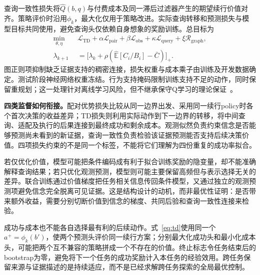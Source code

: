 \documentclass[sigconf,anonymous,review]{acmart}
\newcommand{\E}{\mathbb{E}}
\theoremstyle{zhplain}
\begin{document}
查询一致性损失将\(\hat Q(b,q)\)与付费成本及同一滞后过滤器产生的期望续行价值对齐。策略评价时沿用\(\phi_k\)，最大化仅用于策略改进。实际查询转移和预测损失与模型目标共同使用，避免查询头仅依赖自身想象的奖励训练。总目标为
\begin{equation}
\begin{aligned}
\min_{\theta,\eta}\quad &\mathcal L_{\mathrm{TD}}+\alpha\mathcal L_{\mathrm{pair}}+
\beta\mathcal L_{\mathrm{obs}}+\kappa\mathcal L_{\mathrm{query}}+\xi\mathcal R_{\mathrm{graph}},\\
\lambda_{k+1}&=\big[\lambda_k+\rho(\widehat{\E}[C_i/B_i]-\bar C)\big]_+.
\end{aligned}
\label{eq:joint}
\end{equation}
图正则项抑制缺乏证据支持的稠密连接，损失权重与成本乘子由训练及开发数据确定。测试阶段神经网络权重冻结。行为支持掩码限制训练支持不足的动作，同时保留重规划；这一处理针对离线学习风险，但不继承保守Q学习的理论保证~\cite{cql}。

\textbf{四类监督如何衔接。}配对优势损失比较从同一边界出发、采用同一续行policy时各个首次决策的收益差异；TD损失则利用实际动作到下一边界的转移，将中间查询、适配及执行的后果连接到最终成功和剩余成本。观测似然负责约束信念是否能够预测尚未看到的新证据，查询一致性负责检验该证据预测能否支持后续决策价值。四项损失约束的不是同一个标签，不能将它们理解为四份重复的成功率拟合。

若仅优化价值，模型可能把条件编码成有利于拟合训练奖励的隐变量，却不能准确解释查询结果；若只优化观测预测，模型则可能主要保留高频但与表示选择无关的差异。联合训练通过价值梯度把任务相关信息传回条件模型，又通过独立的观测预测项避免信念完全脱离可见证据。这是结构设计的动机，而非最优性证明：是否带来额外收益，需要分别切断价值到信念的梯度、共同后验和查询一致性连接来检验。

成功与成本也不能各自选择最有利的后续动作。式~\eqref{eq:td}使用同一个\(a^+=\phi_k(b')\)，使两个预测头评价同一续行方案；分别最大化成功头和最小化成本头，可能把两个互不兼容的策略拼成一个不存在的价值。终止标志令任务结束后的bootstrap为零，避免将下一个任务的成功奖励计入本任务的经验效用。跨任务保留来源与证据描述的是持续适应，而不是已经求解跨任务探索的全局最优控制。
\end{document}
